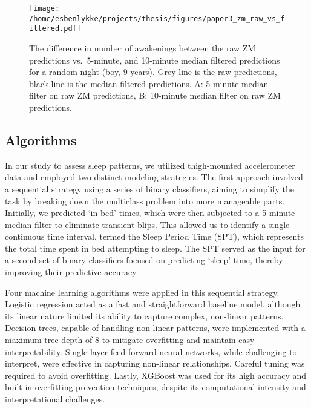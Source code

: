 \documentclass[
  10pt,
]{scrbook}
\begin{document}
\begin{figure}

{\centering \texttt{[image: /home/esbenlykke/projects/thesis/figures/paper3\_zm\_raw\_vs\_filtered.pdf]}

}

\caption{\label{fig-paper3_raw_filt}The difference in number of
awakenings between the raw ZM predictions vs.~5-minute, and 10-minute
median filtered predictions for a random night (boy, 9 years). Grey line
is the raw predictions, black line is the median filtered predictions.
A: 5-minute median filter on raw ZM predictions, B: 10-minute median
filter on raw ZM predictions.}

\end{figure}

\hypertarget{algorithms}{%
\subsection{Algorithms}\label{algorithms}}

In our study to assess sleep patterns, we utilized thigh-mounted
accelerometer data and employed two distinct modeling strategies. The
first approach involved a sequential strategy using a series of binary
classifiers, aiming to simplify the task by breaking down the multiclass
problem into more manageable parts. Initially, we predicted `in-bed'
times, which were then subjected to a 5-minute median filter to
eliminate transient blips. This allowed us to identify a single
continuous time interval, termed the Sleep Period Time (SPT), which
represents the total time spent in bed attempting to sleep. The SPT
served as the input for a second set of binary classifiers focused on
predicting `sleep' time, thereby improving their predictive accuracy.

Four machine learning algorithms were applied in this sequential
strategy. Logistic regression acted as a fast and straightforward
baseline model, although its linear nature limited its ability to
capture complex, non-linear patterns. Decision trees, capable of
handling non-linear patterns, were implemented with a maximum tree depth
of 8 to mitigate overfitting and maintain easy interpretability.
Single-layer feed-forward neural networks, while challenging to
interpret, were effective in capturing non-linear relationships. Careful
tuning was required to avoid overfitting. Lastly, XGBoost was used for
its high accuracy and built-in overfitting prevention techniques,
despite its computational intensity and interpretational challenges.
\end{document}
